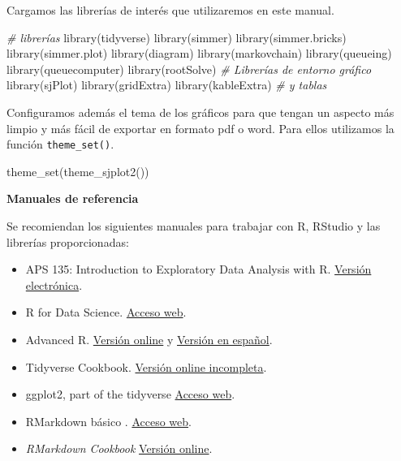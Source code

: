 \documentclass[
]{book}
\newenvironment{Shaded}{\begin{snugshade}}{\end{snugshade}}
\newcommand{\CommentTok}[1]{\textcolor[rgb]{0.56,0.35,0.01}{\textit{#1}}}
\newcommand{\FunctionTok}[1]{\textcolor[rgb]{0.00,0.00,0.00}{#1}}
\newcommand{\NormalTok}[1]{#1}
\theoremstyle{definition}
\theoremstyle{definition}
\theoremstyle{definition}
\theoremstyle{definition}
\theoremstyle{remark}
\begin{document}
Cargamos las librerías de interés que utilizaremos en este manual.

\begin{Shaded}
\begin{Highlighting}[]
\CommentTok{\# librerías}
\FunctionTok{library}\NormalTok{(tidyverse)}
\FunctionTok{library}\NormalTok{(simmer)}
\FunctionTok{library}\NormalTok{(simmer.bricks)}
\FunctionTok{library}\NormalTok{(simmer.plot)}
\FunctionTok{library}\NormalTok{(diagram)}
\FunctionTok{library}\NormalTok{(markovchain)}
\FunctionTok{library}\NormalTok{(queueing)}
\FunctionTok{library}\NormalTok{(queuecomputer)}
\FunctionTok{library}\NormalTok{(rootSolve)}
\CommentTok{\# Librerías de entorno gráfico}
\FunctionTok{library}\NormalTok{(sjPlot)}
\FunctionTok{library}\NormalTok{(gridExtra)}
\FunctionTok{library}\NormalTok{(kableExtra) }\CommentTok{\# y tablas}
\end{Highlighting}
\end{Shaded}

Configuramos además el tema de los gráficos para que tengan un aspecto más limpio y más fácil de exportar en formato pdf o word. Para ellos utilizamos la función \texttt{theme\_set()}.

\begin{Shaded}
\begin{Highlighting}[]
\FunctionTok{theme\_set}\NormalTok{(}\FunctionTok{theme\_sjplot2}\NormalTok{())}
\end{Highlighting}
\end{Shaded}

\textbf{Manuales de referencia}

Se recomiendan los siguientes manuales para trabajar con R, RStudio y las librerías proporcionadas:

\begin{itemize}
\item
  APS 135: Introduction to Exploratory Data Analysis with R. \citep{childs19} \href{https://dzchilds.github.io/eda-for-bio/}{Versión electrónica}.
\item
  R for Data Science. \citep{wickham-grolemund} \href{http://r4ds.had.co.nz/}{Acceso web}.
\item
  Advanced R. \citep{advanced-R} \href{https://adv-r.hadley.nz/}{Versión online} y \href{https://es.r4ds.hadley.nz/}{Versión en español}.
\item
  Tidyverse Cookbook. \citep{grosser18} \href{https://bookdown.org/Tazinho/Tidyverse-Cookbook/}{Versión online incompleta}.
\item
  ggplot2, part of the tidyverse \citep{R-ggplot2} \href{https://ggplot2.tidyverse.org/}{Acceso web}.
\item
  RMarkdown básico \citep{Goicoa17}. \href{http://www.unavarra.es/personal/tgoicoa/ESTADISTICA_RMarkdown_tomas/basicRmarkdown/index.html}{Acceso web}.
\item
  \emph{RMarkdown Cookbook} \citep{rmarkdown2020} \href{https://bookdown.org/yihui/rmarkdown-cookbook}{Versión online}.
\end{itemize}
\end{document}
